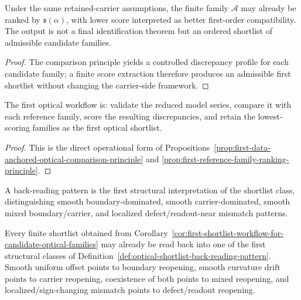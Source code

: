 \begin{proposition}
\label{prop:first-reference-family-ranking-principle}
Under the same retained-carrier assumptions, the finite family $\mathcal A$ may already be ranked by $\mathfrak s(\alpha)$, with lower score interpreted as better first-order compatibility. The output is not a final identification theorem but an ordered shortlist of admissible candidate families.
\end{proposition}

\begin{proof}
The comparison principle yields a controlled discrepancy profile for each candidate family; a finite score extraction therefore produces an admissible first shortlist without changing the carrier-side framework.
\end{proof}

\begin{corollary}
\label{cor:first-shortlist-workflow-for-candidate-optical-families}
The first optical workflow is: validate the reduced model series, compare it with each reference family, score the resulting discrepancies, and retain the lowest-scoring families as the first optical shortlist.
\end{corollary}

\begin{proof}
This is the direct operational form of Propositions~\ref{prop:first-data-anchored-optical-comparison-principle} and \ref{prop:first-reference-family-ranking-principle}.
\end{proof}

\begin{definition}
\label{def:optical-shortlist-back-reading-pattern}
A back-reading pattern is the first structural interpretation of the shortlist class, distinguishing smooth boundary-dominated, smooth carrier-dominated, smooth mixed boundary/carrier, and localized defect/readout-near mismatch patterns.
\end{definition}

\begin{proposition}
\label{prop:first-structural-back-reading-principle-from-optical-shortlists}
Every finite shortlist obtained from Corollary~\ref{cor:first-shortlist-workflow-for-candidate-optical-families} may already be read back into one of the first structural classes of Definition~\ref{def:optical-shortlist-back-reading-pattern}. Smooth uniform offset points to boundary reopening, smooth curvature drift points to carrier reopening, coexistence of both points to mixed reopening, and localized/sign-changing mismatch points to defect/readout reopening.
\end{proposition}

